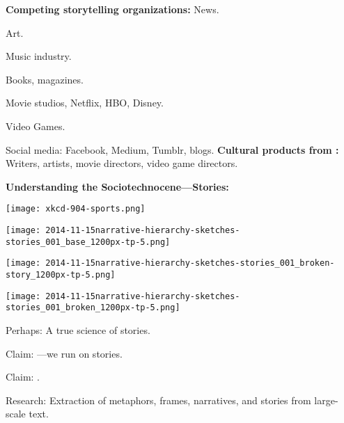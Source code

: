   \textbf{Competing storytelling organizations:}
      News.
     
      Art.
     
      Music industry.
     
      Books, magazines.
     
      Movie studios, Netflix, HBO, Disney.
     
      Video Games.
     
      Social media: Facebook, Medium, Tumblr, blogs.
  \textbf{Cultural products from :}
      Writers, artists, movie directors, video game directors.
  
  
 
  \textbf{Understanding the Sociotechnocene---Stories:}
      
      
\begin{marginfigure}
  \texttt{[image: xkcd-904-sports.png]}
\end{marginfigure}

      {\tiny
      }
      
\begin{marginfigure}
  \texttt{[image: 2014-11-15narrative-hierarchy-sketches-stories\_001\_base\_1200px-tp-5.png]}
\end{marginfigure}

      
\begin{marginfigure}
  \texttt{[image: 2014-11-15narrative-hierarchy-sketches-stories\_001\_broken-story\_1200px-tp-5.png]}
\end{marginfigure}

      
\begin{marginfigure}
  \texttt{[image: 2014-11-15narrative-hierarchy-sketches-stories\_001\_broken\_1200px-tp-5.png]}
\end{marginfigure}

       
        Perhaps: A true science of stories.
      
        Claim: ---we run on stories.
       
        Claim:
        .
      
        Research: Extraction of metaphors, frames, narratives, and stories from large-scale text.
       
